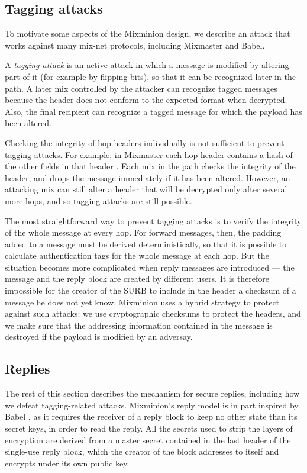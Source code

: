 \documentclass[11pt]{IEEEtran}
\begin{document}
\subsection{Tagging attacks}
\label{subsec:tagging-attacks}

To motivate some aspects of the Mixminion design, we describe an attack
that works against many mix-net protocols, including Mixmaster and Babel.

A {\em tagging attack} is an active attack in which a message is
modified by altering part of it (for example by flipping bits), so
that it can be recognized later in the path.  A later mix controlled by
the attacker can recognize tagged messages because the header does
not conform to the expected format when decrypted.  Also, the final
recipient can recognize a tagged message for which the payload has
been altered.

Checking the integrity of hop headers individually is not
sufficient to prevent tagging attacks.  For example, in Mixmaster
each hop header contains a hash of the other fields in that header
\cite{mixmaster-spec}.
Each mix in the path checks the integrity of the header, and drops
the message immediately if it has been altered.  However, 
an attacking mix can still alter a header that will be decrypted
only after several more hops, and so tagging attacks are still possible.

The most straightforward way to prevent tagging attacks is to
verify the integrity of the whole message at every hop.  For forward messages,
then, the padding added to a message must be derived deterministically,
so that it is possible to calculate
authentication tags for the whole message at each hop.  But
the situation becomes more complicated when reply messages are
introduced --- the message and the reply block are
created by different users. It is therefore impossible for the creator
of the SURB to include in the header a checksum of a message he
does not yet know. Mixminion uses a hybrid strategy to protect against
such attacks: we use cryptographic checksums to protect the headers,
and we make sure that the addressing information contained in the
message is destroyed if the payload is modified by an adversay.

\subsection{Replies}
\label{subsec:replies}

The rest of this section describes the mechanism for secure replies,
including how we defeat tagging-related attacks. Mixminion's reply
model is in part inspired by Babel \cite{babel}, as it requires the
receiver of a reply block to keep no other state than its secret keys,
in order to read the reply.  All the secrets used
to strip the layers of encryption are derived from a master
secret contained in the last header of the single-use reply block, which
the creator of the block addresses to itself and encrypts under its
own public key.
\end{document}
